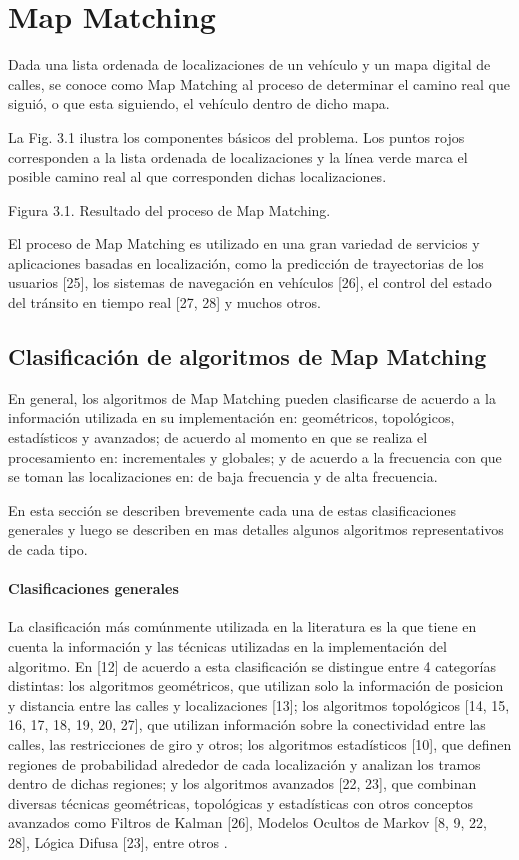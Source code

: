 \chapter{Map Matching}

Dada una lista ordenada de localizaciones de un vehículo y un mapa digital de calles, se conoce como Map Matching al proceso de determinar el camino real que siguió, o que esta siguiendo, el vehículo dentro de dicho mapa.

La Fig. 3.1 ilustra los componentes básicos del problema. Los puntos rojos corresponden a la lista ordenada de localizaciones y la línea verde marca el posible camino real al que corresponden dichas localizaciones.

Figura 3.1. Resultado del proceso de Map Matching.

El proceso de Map Matching es utilizado en una gran variedad de servicios y aplicaciones basadas en localización, como la predicción de trayectorias de los usuarios [25], los sistemas de navegación en vehículos [26], el control del estado del tránsito en tiempo real [27, 28] y muchos otros.

\section{Clasificación de algoritmos de Map Matching}

En general, los algoritmos de Map Matching pueden clasificarse de acuerdo a la información utilizada en su implementación en: geométricos, topológicos, estadísticos y avanzados; de acuerdo al momento en que se realiza el procesamiento en: incrementales y globales; y de acuerdo a la frecuencia con que se toman las localizaciones en: de baja frecuencia y de alta frecuencia.

En esta sección se describen brevemente cada una de estas clasificaciones generales y luego se describen en mas detalles algunos algoritmos representativos de cada tipo.

\subsubsection{Clasificaciones generales}

La clasificación más comúnmente utilizada en la literatura es la que tiene en cuenta la información y las técnicas utilizadas en la implementación del algoritmo. En [12] de acuerdo a esta clasificación se distingue entre 4 categorías distintas: los algoritmos geométricos, que utilizan solo la información de posicion y distancia entre las calles y localizaciones [13]; los algoritmos topológicos [14, 15, 16, 17, 18, 19, 20, 27], que utilizan información sobre la conectividad entre las calles, las restricciones de giro y otros; los algoritmos estadísticos [10], que definen regiones de probabilidad alrededor de cada localización y analizan los tramos dentro de dichas regiones; y los algoritmos avanzados [22, 23], que combinan diversas técnicas geométricas, topológicas y estadísticas con otros conceptos avanzados como Filtros de Kalman [26], Modelos Ocultos de Markov [8, 9, 22, 28], Lógica Difusa [23], entre otros .


